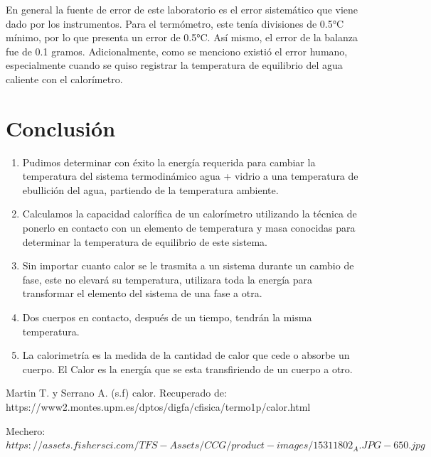 \documentclass[journal,transmag]{IEEEtran}
\begin{document}
En general la fuente de error de este laboratorio es el error sistemático que viene dado por los instrumentos. Para el termómetro, este tenía divisiones de 0.5°C mínimo, por lo que presenta un error de 0.5°C. Así mismo, el error de la balanza fue de 0.1 gramos. Adicionalmente, como se menciono existió el error humano, especialmente cuando se quiso registrar la temperatura de equilibrio del agua caliente con el calorímetro.


\section{Conclusión}
	
	\begin{enumerate}[label=(\roman*)]
		\item Pudimos determinar con éxito la energía requerida para cambiar la temperatura del sistema termodinámico agua + vidrio a una temperatura de ebullición del agua, partiendo de la temperatura ambiente. 
		\item  Calculamos la capacidad calorífica de un calorímetro utilizando la técnica de ponerlo en contacto con un elemento de temperatura y masa conocidas para determinar la temperatura de equilibrio de este sistema. 
		\item  Sin importar cuanto calor se le trasmita a un sistema durante un cambio de fase, este no elevará su temperatura, utilizara toda la energía para transformar el elemento del sistema de una fase a otra.
		\item Dos cuerpos en contacto, después de un tiempo, tendrán la misma temperatura.
		
		\item La calorimetría es la medida de la cantidad de calor que cede o absorbe un cuerpo. El Calor es la energía que se esta transfiriendo de un cuerpo a otro. 
	\end{enumerate}

\appendices


\ifCLASSOPTIONcaptionsoff
  \newpage
\fi


\begin{thebibliography}{1}


 Martin T. y Serrano A. (s.f) calor. Recuperado de: https://www2.montes.upm.es/dptos/digfa/cfisica/termo1p/calor.html

 Mechero: $https://assets.fishersci.com/TFS-Assets/CCG/product-images/15311802_A.JPG-650.jpg $

\end{thebibliography}
\end{document}
